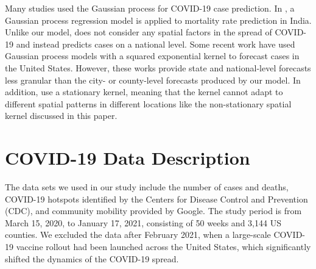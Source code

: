 \documentclass[journal]{IEEEtran}
\begin{document}
Many studies used the Gaussian process for COVID-19 case prediction.
In \cite{dhamodharavadhani2021covid}, a Gaussian process regression model is applied to mortality rate prediction in India. Unlike our model, \cite{dhamodharavadhani2021covid} does not consider any spatial factors in the spread of COVID-19 and instead predicts cases on a national level. Some recent work \cite{velasquez2020forecast, ketu2021enhanced} have used Gaussian process models with a squared exponential kernel to forecast cases in the United States. However, these works provide state and national-level forecasts less granular than the city- or county-level forecasts produced by our model. In addition, \cite{velasquez2020forecast, ketu2021enhanced} use a stationary kernel, meaning that the kernel cannot adapt to different spatial patterns in different locations like the non-stationary spatial kernel discussed in this paper.




\section{COVID-19 Data Description}
\label{sec:data}

The data sets we used in our study include the number of cases and deaths, COVID-19 hotspots identified by the Centers for Disease Control and Prevention (CDC), and community mobility provided by Google. The study period is from March 15, 2020, to January 17, 2021, consisting of 50 weeks and 3,144 US counties. We excluded the data after February 2021, when a large-scale COVID-19 vaccine rollout had been launched across the United States, which significantly shifted the dynamics of the COVID-19 spread.
\end{document}
